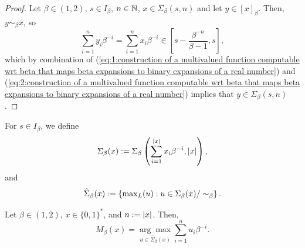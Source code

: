 \begin{proof}
    Let $\beta \in (1,2)$, $s \in I_\beta$, $n \in \mathbb{N}$, $x \in \Sigma_\beta(s,n)$ and let $y \in [x]_\beta$. Then, $y \sim_\beta x$, so 
    \begin{equation}
        \sum_{i=1}^n y_i \beta^{-i} = \sum_{i=1}^n x_i \beta^{-i} \in \left[ s - \frac{\beta^{-n}}{\beta-1}, s\right],
    \end{equation}
    which by combination of (\ref{eq:1:construction of a multivalued function computable wrt beta that maps beta expansions to binary expansions of a real number}) and (\ref{eq:2:construction of a multivalued function computable wrt beta that maps beta expansions to binary expansions of a real number}) implies that $y \in \Sigma_\beta(s,n)$.
\end{proof}
\noindent For $s \in I_\beta$, we define
\begin{equation}\label{eq:definition set of beta expansions wrt to a binary sequence}
    \Sigma_\beta(x) := \Sigma_\beta\left(\sum_{i=1}^{\left| x \right|} x_i \beta^{-i}, \left| x \right|\right),
\end{equation}
and
\begin{equation}\label{eq:definition set of lexicographically maximal elements of equivalence classes in beta expansions of sum x beta -i}
    \hat \Sigma_\beta(x) := \left\{ \mathop{\operatorname{max}_L} (u) : u \in \Sigma_\beta(x) / \sim_\beta\right\}.
\end{equation}
\begin{lemma}
    Let $\beta \in (1,2)$, $x \in \{0,1\}^\ast$, and $n := \left| x \right|$. Then,
    \begin{equation}
        M_\beta(x) = \underset{u \in \hat \Sigma_\beta(x)}{\arg\max} \sum_{i=1}^n u_i \beta^{-i}.
    \end{equation}
\end{lemma}
